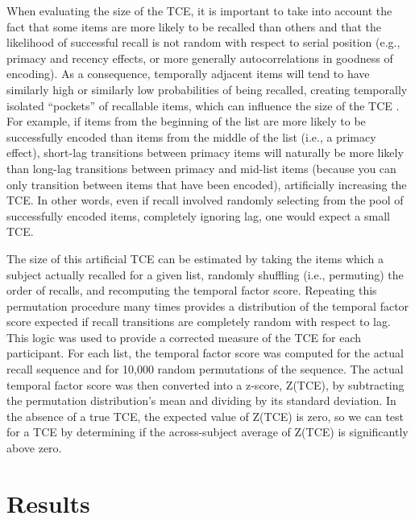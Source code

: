 \documentclass[jou,natbib]{apa6} %
\begin{document}
When evaluating the size of the TCE, it is important to take into account the fact that some items are more likely to be recalled than others and that the likelihood of successful recall is not random with respect to serial position (e.g., primacy and recency effects, or more generally autocorrelations in goodness of encoding). As a consequence, temporally adjacent items will tend to have similarly high or similarly low probabilities of being recalled, creating temporally isolated ``pockets'' of recallable items, which can influence the size of the TCE \citep{Hint16,SedeEtal10}. For example, if items from the beginning of the list are more likely to be successfully encoded than items from the middle of the list (i.e., a primacy effect), short-lag transitions between primacy items will naturally be more likely than long-lag transitions between primacy and mid-list items (because you can only transition between items that have been encoded), artificially increasing the TCE. In other words, even if recall involved randomly selecting from the pool of successfully encoded items, completely ignoring lag, one would expect a small TCE.

The size of this artificial TCE can be estimated by taking the items which a subject actually recalled for a given list, randomly shuffling (i.e., permuting) the order of recalls, and recomputing the temporal factor score. Repeating this permutation procedure many times provides a distribution of the temporal factor score expected if recall transitions are completely random with respect to lag. This logic was used to provide a corrected measure of the TCE for each participant. For each list, the temporal factor score was computed for the actual recall sequence and for 10,000 random permutations of the sequence.
The actual temporal factor score was then converted into a z-score, Z(TCE), by subtracting the permutation distribution's mean and dividing by its standard deviation. In the absence of a true TCE, the expected value of Z(TCE) is zero, so we can test for a TCE by determining if the across-subject average of Z(TCE) is significantly above zero.



\section{Results}
\end{document}
